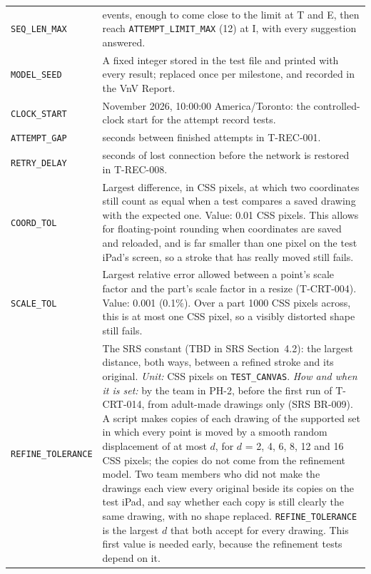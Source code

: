 \documentclass[12pt, titlepage]{article}
\begin{document}
{\begin{longtable}{@{}>{\raggedright\arraybackslash}p{}%
>{\raggedright\arraybackslash}p{}@{}}
\addlinespace
\texttt{SEQ\_LEN\_MAX} & 60 events, enough to come close to the limit at T
and E, then reach \texttt{ATTEMPT\_LIMIT\_MAX} (12) at I, with every
suggestion answered.\\
\addlinespace
\texttt{MODEL\_SEED} & A fixed integer stored in the test file and printed
with every result; replaced once per milestone, and recorded in the VnV
Report.\\
\addlinespace
\texttt{CLOCK\_START} & 16 November 2026, 10:00:00 America/Toronto: the
controlled-clock start for the attempt record tests.\\
\addlinespace
\texttt{ATTEMPT\_GAP} & 60 seconds between finished attempts in
T-REC-001.\\
\addlinespace
\texttt{RETRY\_DELAY} & 2 seconds of lost connection before the network is
restored in T-REC-008.\\
\addlinespace
\texttt{COORD\_TOL} & Largest difference, in CSS pixels, at which two
coordinates still count as equal when a test compares a saved drawing with the
expected one. Value: 0.01 CSS pixels. This allows for floating-point rounding
when coordinates are saved and reloaded, and is far smaller than one pixel on
the test iPad's screen, so a stroke that has really moved still fails.\\
\addlinespace
\texttt{SCALE\_TOL} & Largest relative error allowed between a point's scale
factor and the part's scale factor in a resize (T-CRT-004). Value: 0.001
(0.1\%). Over a part 1000 CSS pixels across, this is at most one CSS pixel,
so a visibly distorted shape still fails.\\
\addlinespace
\texttt{REFINE\_TOLERANCE} & The SRS constant (TBD in SRS Section~4.2): the
largest distance, both ways, between a refined stroke and its original.
\emph{Unit:} CSS pixels on \texttt{TEST\_CANVAS}. \emph{How and when it is
set:} by the team in PH-2, before the first run of T-CRT-014, from adult-made
drawings only (SRS BR-009). A script makes copies of each drawing of the
supported set in which every point is moved by a smooth random displacement
of at most $d$, for $d$ = 2, 4, 6, 8, 12 and 16 CSS pixels; the copies do not
come from the refinement model. Two team members who did not make the
drawings each view every original beside its copies on the test iPad, and
say whether each copy is still clearly the same drawing, with no shape
replaced. \texttt{REFINE\_TOLERANCE} is the largest $d$ that both accept for
every drawing. This first value is needed early, because the refinement
tests depend on it.\\

\end{longtable}}
\end{document}
